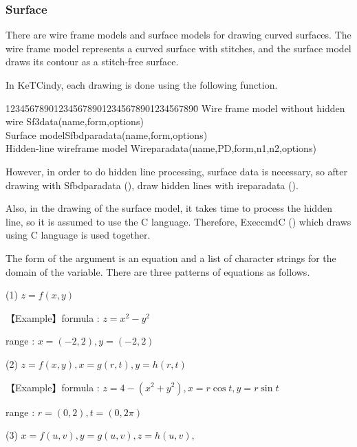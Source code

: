 \documentclass[papersize,a4paper,12pt]{article}
\begin{document}
\subsubsection{Surface}

There are wire frame models and surface models for drawing curved surfaces. The wire frame model represents a curved surface with stitches, and the surface model draws its contour as a stitch-free surface.

In KeTCindy, each drawing is done using the following function.
\begin{tabbing}
1234567890123456789012345678901234567890\=\kill
Wire frame model without hidden wire \>Sf3data(name,form,options)\\
Surface model\>Sfbdparadata(name,form,options)\\
Hidden-line wireframe model \>Wireparadata(name,PD,form,n1,n2,options)
\end{tabbing}

However, in order to do hidden line processing, surface data is necessary, so after drawing with Sfbdparadata (), draw hidden lines with ireparadata ().

Also, in the drawing of the surface model, it takes time to process the hidden line, so it is assumed to use the C language. Therefore, ExeccmdC () which draws using C language is used together.

 \begin{center}  \end{center}

The form of the argument is an equation and a list of character strings for the domain of the variable. There are three patterns of equations as follows.

\vspace{\baselineskip}
(1) $z=f(x,y)$

 \hspace{5mm} 【Example】formula : $z=x^2-y^2$

 \hspace{15mm} range : $x=(-2,2) , y=(-2,2)$

(2) $z=f(x,y),x=g(r,t),y=h(r,t)$

 \hspace{5mm} 【Example】formula : $z=4-(x^2+y^2) , x=r\cos t , y=r\sin t$ 

\hspace{15mm} range : $r=(0,2) , t=(0,2\pi)$

(3) $x=f(u,v),y=g(u,v),z=h(u,v),$
\end{document}
